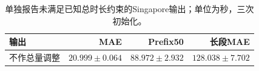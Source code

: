 \begin{table}[t]
\centering\footnotesize\setlength{\tabcolsep}{4pt}
\caption{单独报告未满足已知总时长约束的Singapore输出；单位为秒，三次初始化。}\label{tab:singapore_unconstrained}
\begin{tabular}{lrrr}\toprule
输出 & MAE & Prefix50 & 长段MAE\\\midrule
不作总量调整 & $20.999\pm0.064$ & $88.972\pm2.932$ & $128.038\pm7.702$\\
\bottomrule\end{tabular}
\end{table}
